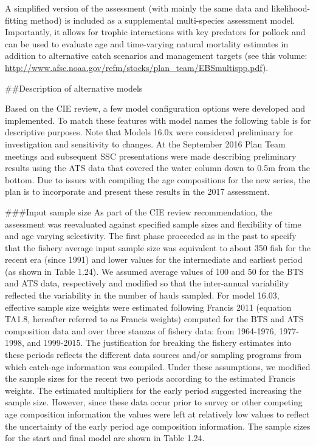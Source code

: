 A simplified version of the assessment (with mainly the same data and
likelihood-fitting method) is included as a supplemental multi-species
assessment model. Importantly, it allows for trophic interactions with
key predators for pollock and can be used to evaluate age and
time-varying natural mortality estimates in addition to alternative
catch scenarios and management targets (see this volume:
\url{http://www.afsc.noaa.gov/refm/stocks/plan_team/EBSmultispp.pdf}).

\#\#Description of alternative models

Based on the CIE review, a few model configuration options were
developed and implemented. To match these features with model names the
following table is for descriptive purposes. Note that Models 16.0x were
considered preliminary for investigation and sensitivity to changes. At
the September 2016 Plan Team meetings and subsequent SSC presentations
were made describing preliminary results using the ATS data that covered
the water column down to 0.5m from the bottom. Due to issues with
compiling the age compositions for the new series, the plan is to
incorporate and present these results in the 2017 assessment.

\#\#\#Input sample size As part of the CIE review recommendation, the
assessment was reevaluated against specified sample sizes and
flexibility of time and age varying selectivity. The first phase
proceeded as in the past to specify that the fishery average input
sample size was equivalent to about 350 fish for the recent era (since
1991) and lower values for the intermediate and earliest period (as
shown in Table 1.24). We assumed average values of 100 and 50 for the
BTS and ATS data, respectively and modified so that the inter-annual
variability reflected the variability in the number of hauls sampled.
For model 16.03, effective sample size weights were estimated following
Francis 2011 (equation TA1.8, hereafter referred to as Francis weights)
computed for the BTS and ATS composition data and over three stanzas of
fishery data: from 1964-1976, 1977-1998, and 1999-2015. The
justification for breaking the fishery estimates into these periods
reflects the different data sources and/or sampling programs from which
catch-age information was compiled. Under these assumptions, we modified
the sample sizes for the recent two periods according to the estimated
Francis weights. The estimated multipliers for the early period
suggested increasing the sample size. However, since these data occur
prior to survey or other competing age composition information the
values were left at relatively low values to reflect the uncertainty of
the early period age composition information. The sample sizes for the
start and final model are shown in Table 1.24.

